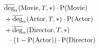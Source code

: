 $\!\begin{aligned}
  &\avgdeg_\alpha(\text{Movie}, T, *) \cdot \sprob(\text{Movie}) \\
  &+ \avgdeg_\alpha(\text{Actor}, T, *) \cdot \sprob(\text{Actor}) \\
  &+ \avgdeg_\alpha(\text{Director}, T, *) \\
  &~~\cdot (1 - \sprob(\text{Actor})) \cdot \sprob(\text{Director})
\end{aligned}$
